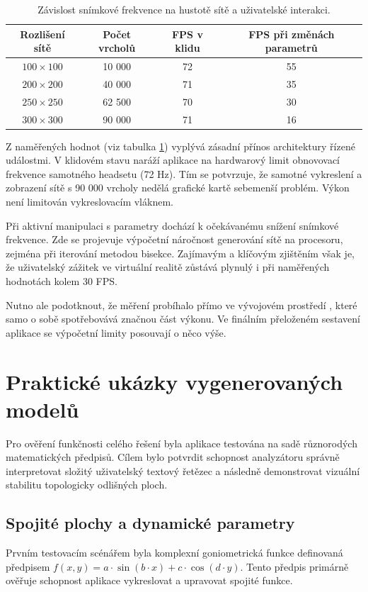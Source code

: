 \documentclass[czech, kiv, sem, he, iso690alph, pdf,viewonly]{fasthesis}
\begin{document}
\begin{table}[htbp]
    \centering
    \begin{tabular}{|c|c|c|c|}
        \hline
        \textbf{Rozlišení sítě} & \textbf{Počet vrcholů} & \textbf{FPS v klidu} & \textbf{FPS při změnách parametrů} \\
        \hline
        $100 \times 100$ & 10 000 & 72 & 55 \\
        $200 \times 200$ & 40 000 & 71 & 35 \\
        $250 \times 250$ & 62 500 & 70 & 30 \\
        $300 \times 300$ & 90 000 & 71 & 16 \\
        \hline
    \end{tabular}
    \caption{Závislost snímkové frekvence na hustotě sítě a uživatelské interakci.}
    \label{tab:vysledky_fps}
\end{table}

Z naměřených hodnot (viz tabulka \ref{tab:vysledky_fps}) vyplývá zásadní přínos architektury řízené událostmi. 
V klidovém stavu naráží aplikace na hardwarový limit obnovovací frekvence samotného headsetu (72 Hz). 
Tím se potvrzuje, že samotné vykreslení a zobrazení sítě s 90 000 vrcholy nedělá grafické kartě sebemenší problém. Výkon není limitován vykreslovacím vláknem.

Při aktivní manipulaci s parametry dochází k očekávanému snížení snímkové frekvence. 
Zde se projevuje výpočetní náročnost generování sítě na procesoru, zejména při iterování metodou bisekce. 
Zajímavým a klíčovým zjištěním však je, že uživatelský zážitek ve virtuální realitě zůstává plynulý i při naměřených hodnotách kolem 30 FPS. 

Nutno ale podotknout, že měření probíhalo přímo ve vývojovém prostředí , které samo o sobě spotřebovává značnou část výkonu. 
Ve finálním přeloženém sestavení aplikace se výpočetní limity posouvají o něco výše.


\section{Praktické ukázky vygenerovaných modelů}
Pro ověření funkčnosti celého řešení byla aplikace testována na sadě různorodých matematických předpisů. 
Cílem bylo potvrdit schopnost analyzátoru správně interpretovat složitý uživatelský textový řetězec a následně demonstrovat vizuální stabilitu topologicky odlišných ploch.

\subsection{Spojité plochy a dynamické parametry}
Prvním testovacím scénářem byla komplexní goniometrická funkce definovaná předpisem $f(x, y) = a \cdot \sin(b \cdot x) + c \cdot \cos(d \cdot y)$. 
Tento předpis primárně ověřuje schopnost aplikace vykreslovat a upravovat spojité funkce. 
\end{document}
